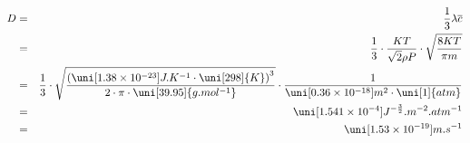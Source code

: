 \begin{eqnarray*}
D
&=&
\frac{
1
}{
3
}
\lambda
\overline{c}
\\ &=&
\frac{
1
}{
3
}
\cdot
\frac{
KT
}{
\sqrt{
2
}
\rho
P
}
\cdot
\sqrt{
\frac{
8KT
}{
\pi
m
}
}
\\ &=&
\frac{
1
}{
3
}
\cdot
\sqrt{
\frac{
{
(
\uni[1.38 \times 10^{-23}]{J.K^{-1}}
\cdot
\uni[298]{K}
)
}^{
3
}
}{
2
\cdot
\pi
\cdot
\uni[39.95]{
g.mol^{-1}
}
}
}
\cdot
\frac{
1
}{
\uni[
0.36 \times
10^{-18}
]{
m^2
}
\cdot
\uni[1]{
atm
}
}
\\ &=&
\uni[1.541 \times 10^{-4}]{
J^{-\frac{3}{2}}.m^{-2}.atm^{-1}
}
\\ &=&
\uni[1.53 \times 10^{-19}]{
m.s^{-1}
}
\label{}
\end{eqnarray*}